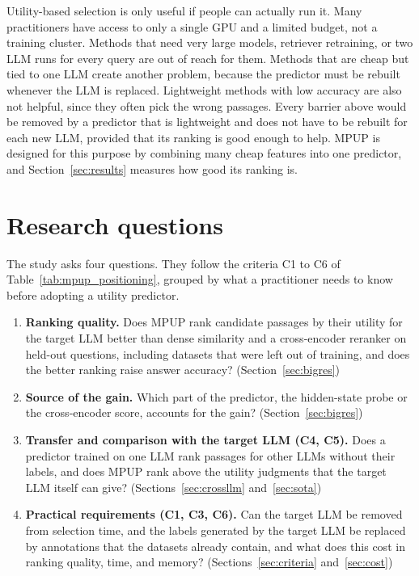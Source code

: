 \documentclass[preprint,12pt,authoryear]{elsarticle}
\begin{document}
Utility-based selection is only useful if people can actually run it. Many practitioners have access to only a single GPU and a limited budget, not a training cluster. Methods that need very large models, retriever retraining, or two LLM runs for every query are out of reach for them. Methods that are cheap but tied to one LLM create another problem, because the predictor must be rebuilt whenever the LLM is replaced. Lightweight methods with low accuracy are also not helpful, since they often pick the wrong passages. Every barrier above would be removed by a predictor that is lightweight and does not have to be rebuilt for each new LLM, provided that its ranking is good enough to help. MPUP is designed for this purpose by combining many cheap features into one predictor, and Section~\ref{sec:results} measures how good its ranking is.

\section{Research questions}\label{sec:rq}
The study asks four questions. They follow the criteria C1 to C6 of Table~\ref{tab:mpup_positioning}, grouped by what a practitioner needs to know before adopting a utility predictor.
\begin{enumerate}
    \item[\textbf{RQ1}] \textbf{Ranking quality.} Does MPUP rank candidate passages by their utility for the target LLM better than dense similarity and a cross-encoder reranker on held-out questions, including datasets that were left out of training, and does the better ranking raise answer accuracy? (Section~\ref{sec:bigres})
    \item[\textbf{RQ2}] \textbf{Source of the gain.} Which part of the predictor, the hidden-state probe or the cross-encoder score, accounts for the gain? (Section~\ref{sec:bigres})
    \item[\textbf{RQ3}] \textbf{Transfer and comparison with the target LLM (C4, C5).} Does a predictor trained on one LLM rank passages for other LLMs without their labels, and does MPUP rank above the utility judgments that the target LLM itself can give? (Sections~\ref{sec:crossllm} and~\ref{sec:sota})
    \item[\textbf{RQ4}] \textbf{Practical requirements (C1, C3, C6).} Can the target LLM be removed from selection time, and the labels generated by the target LLM be replaced by annotations that the datasets already contain, and what does this cost in ranking quality, time, and memory? (Sections~\ref{sec:criteria} and~\ref{sec:cost})
\end{enumerate}
\end{document}
